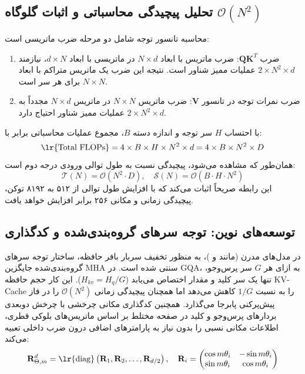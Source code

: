 \documentclass[12pt,a4paper]{report}
\theoremstyle{definition}
\begin{document}
\subsection{تحلیل پیچیدگی محاسباتی و اثبات گلوگاه $\mathcal{O}(N^2)$}
محاسبه تانسور توجه شامل دو مرحله ضرب ماتریسی است:
\begin{enumerate}
    \item ضرب $\mathbf{Q}\mathbf{K}^T$: ضرب ماتریس با ابعاد $N \times d$ در ماتریسی با ابعاد $d \times N$، نیازمند $2 \times N^2 \times d$ عملیات ممیز شناور  است. نتیجه این ضرب یک ماتریس متراکم با ابعاد $N \times N$ برای هر سر است.
    \item ضرب نمرات توجه در تانسور $\mathbf{V}$: ضرب ماتریس $N \times N$ در ماتریس $N \times d$ مجدداً به $2 \times N^2 \times d$ عملیات ممیز شناور احتیاج دارد.
\end{enumerate}
با احتساب $H$ سر توجه و اندازه دسته $B$، مجموع عملیات محاسباتی برابر با:
\begin{equation}
\text{\lr{Total FLOPs}} = 4 \times B \times H \times N^2 \times d = 4 \times B \times N^2 \times D
\end{equation}
همان‌طور که مشاهده می‌شود، پیچیدگی نسبت به طول توالی ورودی درجه دوم است:
\begin{equation}
\mathcal{T}(N) = \mathcal{O}(N^2 \cdot D), \quad \mathcal{S}(N) = \mathcal{O}(B \cdot H \cdot N^2)
\end{equation}
این رابطه صریحاً اثبات می‌کند که با افزایش طول توالی از ۵۱۲ به ۸۱۹۲ توکن، پیچیدگی زمانی و مکانی ۲۵۶ برابر افزایش خواهد یافت.

\subsection{توسعه‌های نوین: توجه سرهای گروه‌بندی‌شده  و کدگذاری }
در مدل‌های مدرن (مانند  و )، به منظور تخفیف سربار بافر حافظه، ساختار توجه سرهای گروه‌بندی‌شده  جایگزین MHA سنتی شده است. در GQA، به ازای هر $G$ سر پرس‌وجو، تنها یک سر کلید و مقدار اختصاص می‌یابد ($H_{kv} = H_q / G$). این کار حجم حافظه KV-Cache را به نسبت $1/G$ کاهش می‌دهد اما همچنان پیچیدگی زمانی $\mathcal{O}(N^2)$ را در فاز پیش‌پرکنی  پابرجا می‌گذارد. همچنین کدگذاری مکانی چرخشی  با چرخش دوبعدی بردارهای پرس‌وجو و کلید در صفحه مختلط بر اساس ماتریس‌های بلوکی قطری، اطلاعات مکانی نسبی را بدون نیاز به پارامترهای اضافی درون ضرب داخلی تعبیه می‌کند:
\begin{equation}
\mathbf{R}_{\Theta, m}^d = \text{\lr{diag}}\left( \mathbf{R}_1, \mathbf{R}_2, \dots, \mathbf{R}_{d/2} \right), \quad \mathbf{R}_i = \begin{pmatrix} \cos m\theta_i & -\sin m\theta_i \\ \sin m\theta_i & \cos m\theta_i \end{pmatrix}
\end{equation}
\end{document}
